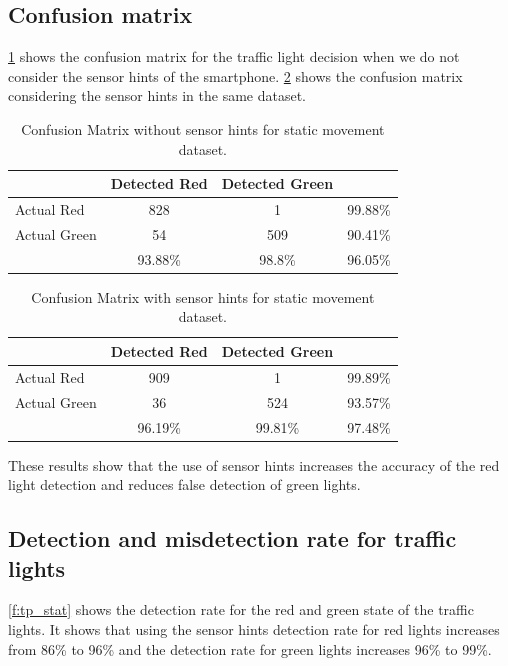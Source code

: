 \subsection{Confusion matrix}
\ref{t:con_nocrp} shows the confusion matrix for the traffic light decision when we do not consider the sensor hints of the smartphone.
\ref{t:con_crp} shows the confusion matrix considering the sensor hints in the same dataset.

\begin{table}[h!]
  \centering
  \caption{Confusion Matrix without sensor hints for static movement dataset.}
  \label{t:con_nocrp}
  \begin{tabular}{  l | c | c | r }
   
     & Detected Red & Detected Green &  \\
    \hline
    Actual Red & 828 & 1 & 99.88\% \\
    \hline
    Actual Green & 54 & 509 & 90.41\% \\
    \hline
    & 93.88\% & 98.8\% & 96.05\% \\
    
  \end{tabular}
\end{table}

\begin{table}[h!]
  \centering
  \caption{Confusion Matrix with sensor hints for static movement dataset.}
  \label{t:con_crp}
  \begin{tabular}{  l | c | c | r }
   
     & Detected Red & Detected Green &  \\
    \hline
    Actual Red & 909 & 1 & 99.89\% \\
    \hline
    Actual Green & 36 & 524 & 93.57\% \\
    \hline
    & 96.19\% & 99.81\% & 97.48\% \\
    
  \end{tabular}
\end{table}

These results show that the use of sensor hints increases the accuracy of the red light detection and reduces false detection of green lights.


\subsection{Detection and misdetection rate for traffic lights}
\ref{f:tp_stat} shows the detection rate for the red and green state of the traffic lights.
It shows that using the sensor hints detection rate for red lights increases from 86\% to 96\% and the detection rate for green lights increases 96\% to 99\%.

